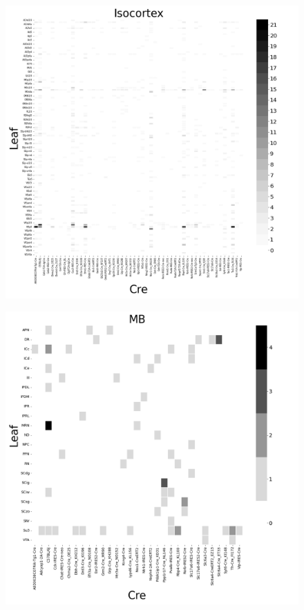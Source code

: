\begin{figure}[H]
    \centering
    \includegraphics[width = 7in]{figs/Isocortex centroid density.png}
    \label{fig:iso_count}
\end{figure}
\newpage

\begin{figure}[H]
    \centering
    \includegraphics[width = 7in]{figs/MB centroid density.png} 
    \label{fig:my_label}
\end{figure}
\newpage

